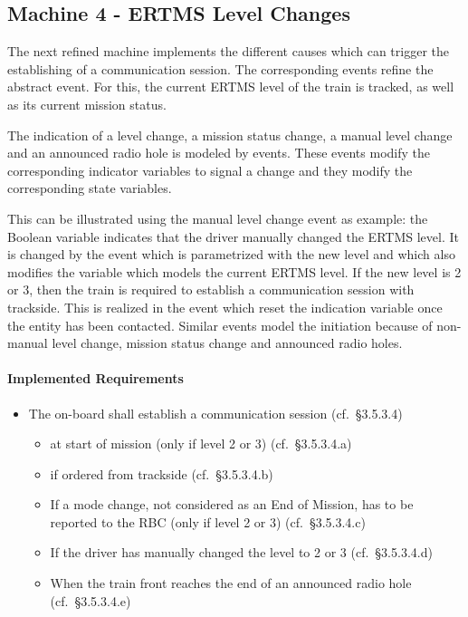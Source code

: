 \documentclass{template/openetcs_article}
\begin{document}
\subsection{Machine 4 - ERTMS Level Changes}
\label{sec:machine-4-ertms}

The next refined machine implements the different causes which can trigger the
establishing of a communication session. The corresponding events refine the
abstract  event. For this, the current
ERTMS level of the train is tracked, as well as its current mission status.

The indication of a level change, a mission status change, a manual level change
and an announced radio hole is modeled by events. These events modify the
corresponding indicator variables to signal a change and they modify the
corresponding state variables.

This can be illustrated using the manual level change event as example: the
Boolean variable  indicates that the driver
manually changed the ERTMS level. It is changed by the
 event which is parametrized with the new level and
which also modifies the  variable which models the current
ERTMS level. If the new level is 2 or 3, then the train is required to establish
a communication session with trackside. This is realized in the
 event which reset the
indication variable once the entity has been contacted.  Similar events model
the initiation because of non-manual level change, mission status change and
announced radio holes.

\paragraph{Implemented Requirements}
\label{sec:impl-requ-3}

\begin{itemize}
\item The on-board shall establish a communication session (cf.~§3.5.3.4)
  \begin{itemize}
  \item at start of mission (only if level 2 or 3) (cf.~§3.5.3.4.a)
  \item if ordered from trackside (cf.~§3.5.3.4.b)
  \item If a mode change, not considered as an End of Mission, has to be
    reported to the RBC (only if level 2 or 3) (cf.~§3.5.3.4.c)
  \item If the driver has manually changed the level to 2 or 3 (cf.~§3.5.3.4.d)
  \item When the train front reaches the end of an announced radio hole
    (cf.~§3.5.3.4.e)
  \end{itemize}
\end{itemize}
\end{document}
